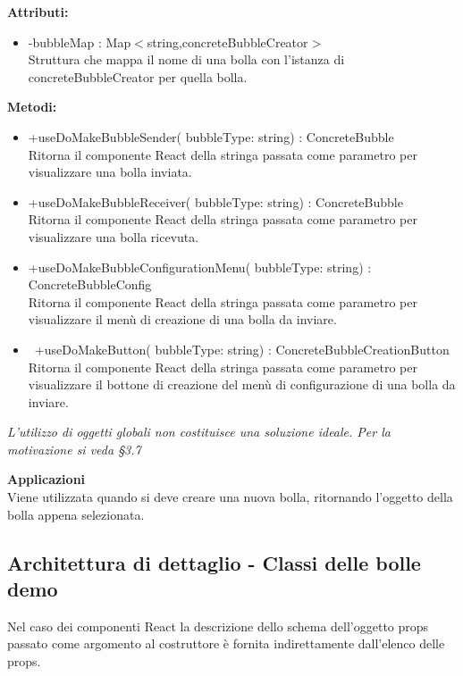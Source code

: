 \textbf{Attributi:}
\begin{itemize}
\item -bubbleMap : Map$<$string,concreteBubbleCreator$>$ 
\\
Struttura che mappa il nome di una bolla con l'istanza di concreteBubbleCreator per quella bolla.
\end{itemize}
\textbf{Metodi:} 
\begin{itemize}
\item +useDoMakeBubbleSender( bubbleType: string) : ConcreteBubble \\
Ritorna il componente React della stringa passata come parametro per visualizzare una bolla inviata.
\item +useDoMakeBubbleReceiver( bubbleType: string) : ConcreteBubble \\
Ritorna il componente React della stringa passata come parametro per visualizzare una bolla ricevuta.
\item +useDoMakeBubbleConfigurationMenu( bubbleType: string) : ConcreteBubbleConfig 
\\
Ritorna il componente React della stringa passata come parametro per visualizzare il menù di creazione di una bolla da inviare.
\item  +useDoMakeButton( bubbleType: string) : ConcreteBubbleCreationButton \\
Ritorna il componente React della stringa passata come parametro per visualizzare il bottone di creazione del menù di configurazione di una bolla da inviare.

\end{itemize}

\emph{L'utilizzo di oggetti globali non costituisce una soluzione ideale. Per la motivazione si veda \S 3.7} 


\textbf{Applicazioni}\\
Viene utilizzata quando si deve creare una nuova bolla, ritornando l'oggetto della bolla appena selezionata. 


\subsection{Architettura di dettaglio - Classi delle bolle demo}
Nel caso dei componenti React la descrizione dello schema dell'oggetto props passato come argomento al costruttore è fornita indirettamente dall'elenco delle props.
